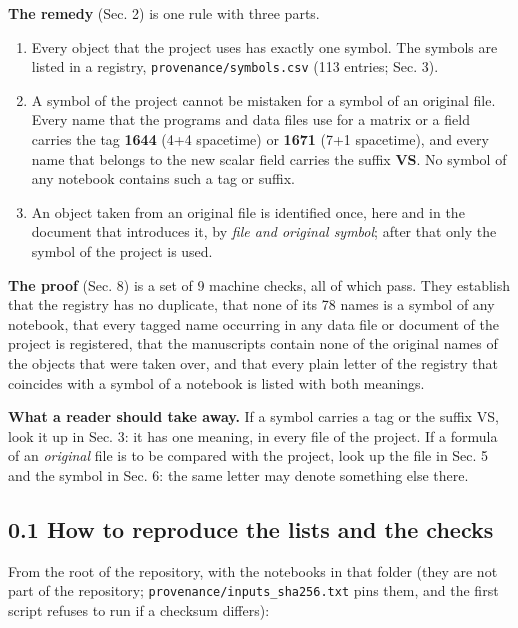 \documentclass[
  10pt,
]{article}
\providecommand{\tightlist}{%
  \setlength{\itemsep}{0pt}\setlength{\parskip}{0pt}}
\begin{document}
\textbf{The remedy} (Sec. 2) is one rule with three parts.

\begin{enumerate}
\def\labelenumi{\arabic{enumi}.}
\tightlist
\item
  Every object that the project uses has exactly one symbol. The symbols
  are listed in a registry, \texttt{provenance/symbols.csv} (113
  entries; Sec. 3).
\item
  A symbol of the project cannot be mistaken for a symbol of an original
  file. Every name that the programs and data files use for a matrix or
  a field carries the tag \textbf{1644} (4+4 spacetime) or \textbf{1671}
  (7+1 spacetime), and every name that belongs to the new scalar field
  carries the suffix \textbf{VS}. No symbol of any notebook contains
  such a tag or suffix.
\item
  An object taken from an original file is identified once, here and in
  the document that introduces it, by \emph{file and original symbol};
  after that only the symbol of the project is used.
\end{enumerate}

\textbf{The proof} (Sec. 8) is a set of 9 machine checks, all of which
pass. They establish that the registry has no duplicate, that none of
its 78 names is a symbol of any notebook, that every tagged name
occurring in any data file or document of the project is registered,
that the manuscripts contain none of the original names of the objects
that were taken over, and that every plain letter of the registry that
coincides with a symbol of a notebook is listed with both meanings.

\textbf{What a reader should take away.} If a symbol carries a tag or
the suffix VS, look it up in Sec. 3: it has one meaning, in every file
of the project. If a formula of an \emph{original} file is to be
compared with the project, look up the file in Sec. 5 and the symbol in
Sec. 6: the same letter may denote something else there.

\hypertarget{how-to-reproduce-the-lists-and-the-checks}{%
\subsection{0.1 How to reproduce the lists and the
checks}\label{how-to-reproduce-the-lists-and-the-checks}}

From the root of the repository, with the notebooks in that folder (they
are not part of the repository; \texttt{provenance/inputs\_sha256.txt}
pins them, and the first script refuses to run if a checksum differs):
\end{document}
